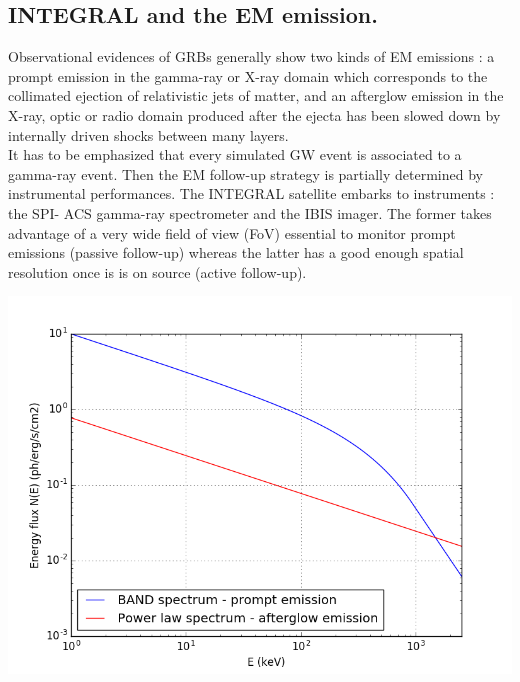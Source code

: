 \documentclass[a0,portrait]{a0poster}
\begin{document}
\begin{multicols}{2}
\section*{INTEGRAL and the EM emission.}


\indent Observational evidences of GRBs generally show two kinds of EM emissions : a prompt emission in the gamma-ray or X-ray domain which corresponds to the collimated ejection of relativistic jets of matter, and an afterglow emission in the X-ray, optic or radio domain produced after the ejecta has been slowed down by internally driven shocks between many layers. \\
\indent It has to be emphasized that every simulated GW event is associated to a gamma-ray event. Then the EM follow-up strategy is partially determined by instrumental performances. The INTEGRAL satellite embarks to instruments : the SPI- ACS gamma-ray spectrometer and the IBIS imager. The former takes advantage of a very wide field of view (FoV) essential to monitor prompt emissions (passive follow-up) whereas the latter has a good enough spatial resolution once is is on source (active follow-up).


\begin{center}\vspace{.5cm}
    \includegraphics[scale=1.4]{figures/spectra.png}
    \label{spectra}
\end{center}


\end{multicols}
\end{document}
